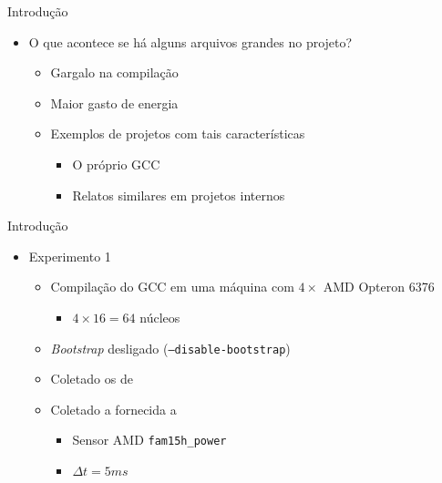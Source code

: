 \begin{frame}{Introdução}
    \begin{itemize}
        \item O que acontece se há alguns arquivos grandes no projeto?
        \begin{itemize}
            \item Gargalo na compilação
            \item Maior gasto de energia
            \item Exemplos de projetos com tais características
                \begin{itemize}
                    \item O próprio GCC
                    \item Relatos similares em projetos internos \citep{mailgcc}
                \end{itemize}
        \end{itemize}
    \end{itemize}
\end{frame}

\begin{frame}{Introdução}
    \begin{itemize}
        \item Experimento 1
        \begin{itemize}
            \item Compilação do GCC em uma máquina com $4\times$ AMD Opteron 6376
                \begin{itemize}
                    \item $4 \times 16 = 64$ núcleos
                \end{itemize}
            \item \textit{Bootstrap} desligado (\texttt{--disable-bootstrap})
            \item Coletado os {\color{blue}{tempos de compilação}} de {\color{red}{cada arquivo}}
            \item Coletado a {\color{blue}{soma da potência instantânea}} fornecida a
                {\color{red}{cada processador}}
                \begin{itemize}
                    \item Sensor AMD \texttt{fam15h\_power}
                    \item $\Delta t = 5ms$
                \end{itemize}
        \end{itemize}
    \end{itemize}
\end{frame}

